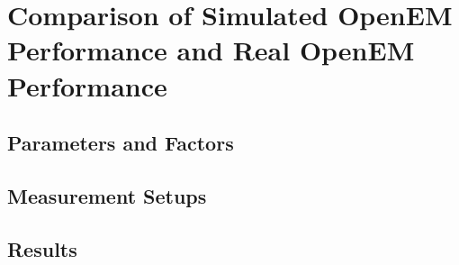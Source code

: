 \section{Comparison of Simulated OpenEM Performance and Real OpenEM Performance}
\label{sec:secondexperiment}
\subsection{Parameters and Factors}
\subsection{Measurement Setups}
\subsection{Results}

